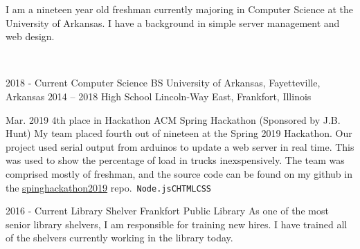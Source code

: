 \documentclass[9pt]{developercv} %
\begin{document}
	\begin{minipage}[t]{0.45\textwidth}
		\vspace{-\baselineskip} %

		I am a nineteen year old freshman currently majoring in Computer Science at the University of Arkansas. I have a background in simple server management and web design.

	\end{minipage}
	\hfill %
	\begin{minipage}[t]{0.5\textwidth} %
		\vspace{-\baselineskip} %
		\vspace{.2cm}\\
		
	\end{minipage}

\vspace{0.5cm}



\begin{entrylist}
	\entry
		{2018 - Current}
		{Computer Science BS}
		{}
		{University of Arkansas, Fayetteville, Arkansas}
	\entry
		{2014 -- 2018}
		{High School}
		{}
		{Lincoln-Way East, Frankfort, Illinois}
\end{entrylist}


\begin{entrylist}
	\entry
		{Mar. 2019}
		{4th place in Hackathon}
		{ACM Spring Hackathon (Sponsored by J.B. Hunt)}
		{My team placed fourth out of nineteen at the Spring 2019 Hackathon. Our project used serial output from arduinos to update a web server in real time. This was used to show the percentage of load in trucks inexspensively. The team was comprised mostly of freshman, and the source code can be found on my github in the \href{https://www.github.com/dizeeee/springhackathon2019}{spinghackathon2019} repo.\
		\newline\texttt{Node.js}\slashsep\texttt{C}\slashsep\texttt{HTML}\slashsep\texttt{CSS}}
\end{entrylist}

\begin{entrylist}
	\entry
		{2016 - Current}
		{Library Shelver}
		{Frankfort Public Library}
		{As one of the most senior library shelvers, I am responsible for training new hires. I have trained all of the shelvers currently working in the library today.}\
\end{entrylist}
\end{document}
